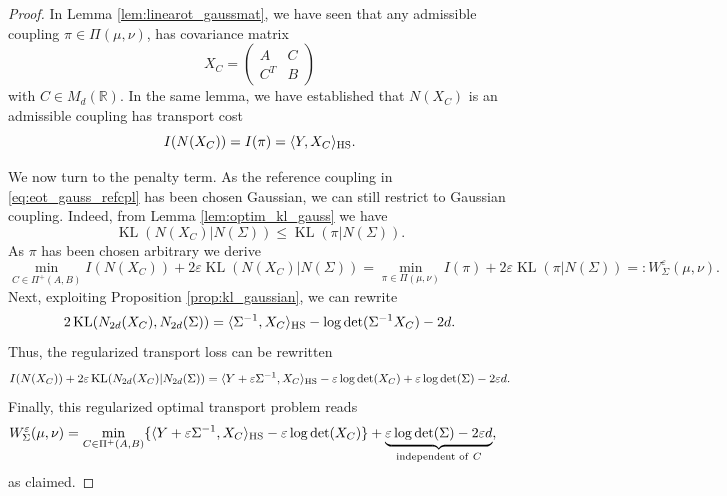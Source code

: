 \documentclass[]{article}
\DeclareMathOperator{\KL}{KL}
\numberwithin{equation}{section}
\theoremstyle{plain}
\begin{document}
\begin{proof}
	In Lemma \ref{lem:linearot_gaussmat}, we have seen that any admissible coupling $\pi \in \Pi(\mu,\nu)$, has covariance matrix 
	\begin{equation*}
		X_C = \begin{pmatrix}
			A & C \\
			C^T & B
		\end{pmatrix}
	\end{equation*}
    with  $C \in M_d(\mathbb{R})$. In the same lemma, we have established that $N(X_C)$ is an admissible coupling has transport cost
    \begin{equation*}
        I(N(X_C)) = I(\pi) = \langle Y, X_C \rangle_{\rm HS}.
    \end{equation*}

We now turn to the penalty term. As the reference coupling in \eqref{eq:eot_gauss_refcpl} has been chosen Gaussian, we can still restrict to Gaussian coupling.
Indeed, from Lemma \ref{lem:optim_kl_gauss} we have 
\begin{equation*}
	\KL(N(X_C)|N(\Sigma)) \leq \KL(\pi|N(\Sigma)).
\end{equation*}
As $\pi$ has been chosen arbitrary we derive
\begin{equation*}
	\min_{C \in \Pi^{+}(A,B)} I(N(X_C))+2\varepsilon\KL(N(X_C)|N(\Sigma)) = \min_{\pi \in \Pi(\mu,\nu)} I(\pi) + 2\varepsilon \KL(\pi|N(\Sigma)) =: W_\Sigma^{\varepsilon}(\mu,\nu).
\end{equation*}
Next, exploiting Proposition \ref{prop:kl_gaussian}, we can rewrite 
    \begin{equation*}
        2\KL(N_{2d}(X_C), N_{2d}(\Sigma)) = \langle \Sigma^{-1}, X_C \rangle_{\rm HS} - \log \det(\Sigma^{-1} X_C) -2d.
    \end{equation*}
    Thus, the regularized transport loss can be rewritten
    \begin{equation*}
        I(N(X_C)) + 2\varepsilon \KL(N_{2d}(X_C)| N_{2d}(\Sigma)) = \langle Y+\varepsilon \Sigma^{-1}, X_C \rangle_{\rm HS} - \varepsilon\log \det(X_C) + \varepsilon\log \det(\Sigma) -2\varepsilon d.
    \end{equation*}
    Finally, this regularized optimal transport problem reads
    \begin{align*}
        W_\Sigma^\varepsilon(\mu, \nu) & = \min_{C \in \Pi^{+}(A,B)} \{ \langle Y+\varepsilon \Sigma^{-1}, X_C \rangle_{\rm HS} - \varepsilon\log \det(X_C) \} + \underbrace{\varepsilon\log \det(\Sigma) -2\varepsilon d}_{\text{independent of}~C},
    \end{align*}
    as claimed.
\end{proof}
\end{document}
